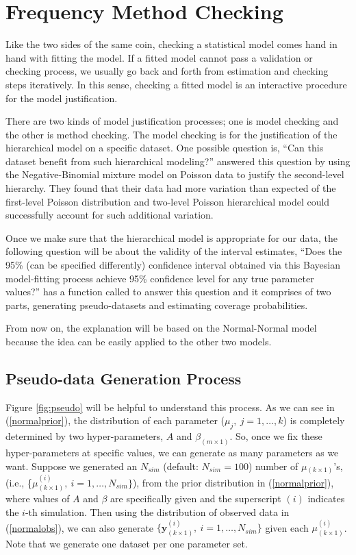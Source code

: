 \documentclass[article]{jss}
\begin{document}
\section[Frequency Method Checking]{Frequency Method Checking}
Like the two sides of the same coin, checking a statistical model comes hand in hand with fitting the model. If a fitted model cannot pass a validation or checking process, we usually go back and forth from estimation and checking steps iteratively. In this sense, checking a fitted model is an interactive procedure for the model justification.


There are two kinds of model justification processes; one is model checking and the other is method checking. The model checking is for the justification of the hierarchical model on a specific dataset. One possible question is, ``Can this dataset benefit from such hierarchical modeling?'' \cite{modelchecking1996} answered this question by using the Negative-Binomial mixture model on Poisson data to justify the second-level hierarchy. They found that their data had more variation than expected of the first-level Poisson distribution and two-level Poisson hierarchical model could successfully account for such additional variation.


Once we make sure that the hierarchical model is appropriate for our data, the following question will be about the validity of the interval estimates, ``Does the 95\% (can be specified differently) confidence interval obtained via this Bayesian model-fitting process achieve 95\% confidence level  for any true parameter values?''  has a function called  to answer this question and it comprises of two parts, generating pseudo-datasets and estimating coverage probabilities.

From now on, the explanation will be based on the Normal-Normal model because the idea can be easily applied to the other two models.

\subsection{Pseudo-data Generation Process}
Figure \ref{fig:pseudo} will be helpful to understand this process. As we can see in (\ref{normalprior}), the distribution of each parameter ($\mu_{j},~j=1,\ldots, k$) is completely determined by two hyper-parameters, $A$ and $\beta_{(m\times1)}$. So, once we fix these hyper-parameters at specific values, we can generate as many parameters as we want. Suppose we generated an $N_{sim}$ (default: $N_{sim} = 100$) number of {\boldmath $\mu$}$_{(k\times1)}$'s, (i.e., \{{\boldmath $\mu$}$^{(i)}_{(k\times1)},~i=1, \ldots, N_{sim}\}$), from the prior distribution in (\ref{normalprior}), where values of $A$ and $\beta$ are specifically given and the superscript $(i)$ indicates the $i$-th simulation. Then using the distribution of observed data in (\ref{normalobs}), we can also generate $\{\mathbf{y}^{(i)}_{(k\times1)},~i=1, \ldots, N_{sim}\}$ given each {\boldmath$\mu$}$^{(i)}_{(k\times1)}$. Note that we generate one dataset per one parameter set.
\end{document}

